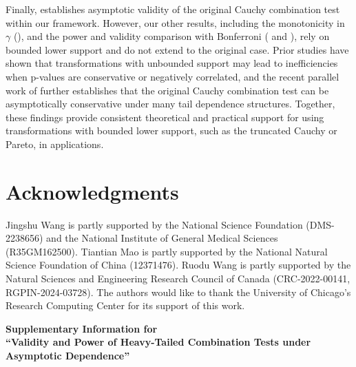 \documentclass[12pt]{article}
\theoremstyle{plain}
\theoremstyle{plain}
\theoremstyle{definition}
\begin{document}
Finally,  establishes asymptotic validity of the original Cauchy combination test within our framework. However, our other results, including the monotonicity in $\gamma$ (), and the power and validity comparison with Bonferroni ( and ), rely on bounded lower support and do not extend to the original case. Prior studies \citep{fang2023heavy,gui2023aggregating} have shown that transformations with unbounded support may lead to inefficiencies when 
p-values are conservative or negatively correlated, and the recent parallel work of \cite{chakraborty2025universal} further establishes that the original Cauchy combination test can be asymptotically conservative under many tail dependence structures. Together, these findings provide consistent theoretical and practical support for using transformations with bounded lower support, such as the truncated Cauchy or Pareto, in applications.



\section*{Acknowledgments}
Jingshu Wang is partly supported by the National Science Foundation (DMS-2238656) and the National Institute of General Medical Sciences (R35GM162500).  
Tiantian Mao is partly supported by the National Natural Science Foundation of China (12371476). Ruodu Wang is partly supported by the Natural Sciences and Engineering Research Council of Canada (CRC-2022-00141, RGPIN-2024-03728). 
The authors would like to thank the University of Chicago’s Research Computing Center for its support of this work.










\newpage

\renewcommand{\thesection}{S\arabic{section}}   
\renewcommand{\thetable}{S\arabic{table}}   
\renewcommand{\thefigure}{S\arabic{figure}}

\setcounter{section}{0}
\setcounter{figure}{0}
\setcounter{table}{0}

\renewcommand {\thepage} {S\arabic{page}}
\setcounter{page}{1}


\begin{center}
	{\Large\bfseries Supplementary Information for \\[0.5em]
		``Validity and Power of Heavy-Tailed Combination Tests under Asymptotic Dependence''}
\end{center}
\end{document}

